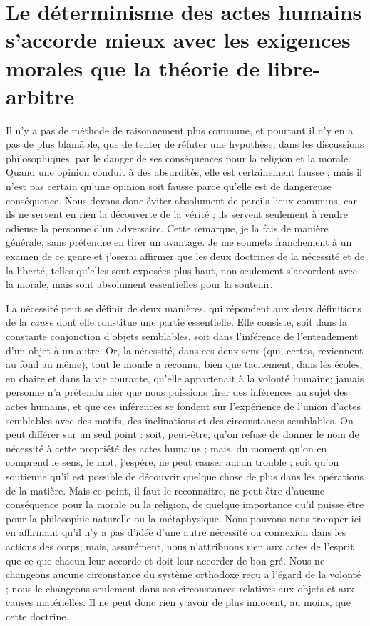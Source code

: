 
\section{Le déterminisme des actes humains s'accorde mieux avec les exigences morales que la théorie de libre-arbitre}

Il n’y a pas de méthode de raisonnement plus commune,
et pourtant il n’y en a pas de plus blamâble, que de tenter
de réfuter une hypothèse, dans les discussions philosophiques,
par le danger de ses conséquences pour la religion
et la morale. Quand une opinion conduit à des absurdités,
elle est certainement fausse ; mais il n’est pas certain
qu’une opinion soit fausse parce qu’elle est de dangereuse
conséquence. Nous devons donc éviter absolument de
pareils lieux communs, car ils ne servent en rien la découverte
de la vérité ; ils servent seulement à rendre odieuse
la personne d’un adversaire. Cette remarque, je la fais
de manière générale, sans prétendre en tirer un avantage.
Je me soumets franchement à un examen de ce genre et
j’oserai affirmer que les deux doctrines de la nécessité et
de la liberté, telles qu’elles sont exposées plus haut, non
seulement s’accordent avec la morale, mais sont absolument
essentielles pour la soutenir.

La nécessité peut se définir de deux manières, qui répondent
aux deux définitions de la {\it cause} dont elle constitue
une partie essentielle. Elle consiste, soit dans la constante
conjonction d’objets semblables, soit dans l’inférence de
l'entendement d’un objet à un autre. Or, la nécessité,
dans ces deux sens (qui, certes, reviennent au fond au
même), tout le monde a reconnu, bien que tacitement,
dans les écoles, en chaire et dans la vie courante, qu’elle
appartenait à la volonté humaine; jamais personne n’a
prétendu nier que nous puissions tirer des inférences au
sujet des actes humains, et que ces inférences se fondent
sur l'expérience de l’union d’actes semblables avec des
motifs, des inclinations et des circonstances semblables.
On peut différer sur un seul point : soit, peut-être, qu’on
refuse de donner le nom de nécessité à cette propriété des
actes humains ; mais, du moment qu’on en comprend le
sens, le mot, j’espére, ne peut causer aucun trouble ; soit
qu’on soutienne qu’il est possible de découvrir quelque
chose de plus dans les opérations de la matière. Mais ce
point, il faut le reconnaitre, ne peut être d’aucune conséquence
pour la morale ou la religion, de quelque importance
qu’il puisse être pour la philosophie naturelle ou la
métaphysique. Nous pouvons nous tromper ici en affirmant
qu’il n’y a pas d’idée d’une autre nécessité ou
connexion dans les actions des corps; mais, assurément,
nous n’attribuons rien aux actes de l'esprit que ce que
chacun leur accorde et doit leur accorder de bon gré. Nous
ne changeons aucune circonstance du système orthodoxe
recu a l'égard de la volonté ; nous le changeons seulement
dans ses circonstances relatives aux objets et aux causes
matérielles. Il ne peut donc rien y avoir de plus innocent,
au moins, que cette doctrine.

